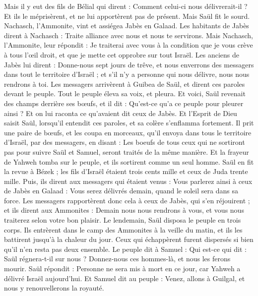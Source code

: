 \begin{multicols}{2}
Mais il y eut des fils de Bélial qui dirent : Comment celui-ci nous délivrerait-il ? Et ils le méprisèrent, et ne lui apportèrent pas de présent. Mais Saül fit le sourd.
\VerseOne{}Nachasch, l'Ammonite, vint et assiégea Jabès en Galaad. Les habitants de Jabès dirent à Nachasch : Traite alliance avec nous et nous te servirons.
Mais Nachasch, l'Ammonite, leur répondit : Je traiterai avec vous à la condition que je vous crève à tous l'œil droit, et que je mette cet opprobre sur tout Israël.
Les anciens de Jabès lui dirent : Donne-nous sept jours de trêve, et nous enverrons des messagers dans tout le territoire d'Israël ; et s'il n'y a personne qui nous délivre, nous nous rendrons à toi.
Les messagers arrivèrent à Guibea de Saül, et dirent ces paroles devant le peuple. Tout le peuple éleva sa voix, et pleura.
Et voici, Saül revenait des champs derrière ses bœufs, et il dit : Qu'est-ce qu'a ce peuple pour pleurer ainsi ? Et on lui raconta ce qu'avaient dit ceux de Jabès.
Et l'Esprit de Dieu saisit Saül, lorsqu'il entendit ces paroles, et sa colère s'enflamma fortement.
Il prit une paire de bœufs, et les coupa en morceaux, qu'il envoya dans tous le territoire d'Israël, par des messagers, en disant : Les boeufs de tous ceux qui ne sortiront pas pour suivre Saül et Samuel, seront traités de la même manière. Et la frayeur de Yahweh tomba sur le peuple, et ils sortirent comme un seul homme.
Saül en fit la revue à Bézek ; les fils d'Israël étaient trois cents mille et ceux de Juda trente mille.
Puis, ils dirent aux messagers qui étaient venus : Vous parlerez ainsi à ceux de Jabès en Galaad : Vous serez délivrés demain, quand le soleil sera dans sa force. Les messagers rapportèrent donc cela à ceux de Jabès, qui s'en réjouirent ;
et ils dirent aux Ammonites : Demain nous nous rendrons à vous, et vous nous traiterez selon votre bon plaisir.
Le lendemain, Saül disposa le peuple en trois corps. Ils entrèrent dans le camp des Ammonites à la veille du matin, et ils les battirent jusqu'à la chaleur du jour. Ceux qui échappèrent furent dispersés si bien qu'il n'en resta pas deux ensemble.
Le peuple dit à Samuel : Qui est-ce qui dit : Saül régnera-t-il sur nous ? Donnez-nous ces hommes-là, et nous les ferons mourir.
Saül répondit : Personne ne sera mis à mort en ce jour, car Yahweh a délivré Israël aujourd'hui.
Et Samuel dit au peuple : Venez, allons à Guilgal, et nous y renouvellerons la royauté.

\end{multicols}
